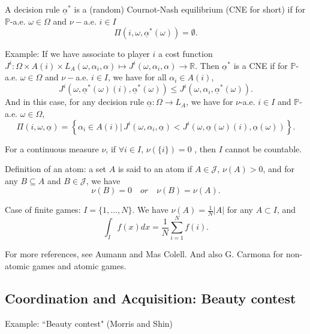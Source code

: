 \begin{definition}
	A decision rule $\underline{\alpha}^*$ is a (random) Cournot-Nash equilibrium (CNE for short) if for $\mathbb{P}$-a.e. $\omega \in \Omega$ and $\nu-$a.e. $i \in I$
	$$
		\Pi(i, \omega, \underline{\alpha}^*(\omega)) = \emptyset.	
	$$
\end{definition}

Example: If we have associate to player $i$ a cost function $J^i : \Omega \times A(i) \times L_A (\omega, \alpha_i, \alpha) \mapsto J^i(\omega, \alpha_i, \alpha) \to \mathbb{R}$. Then $\underline{\alpha}^*$ is a CNE if for $\mathbb{P}$-a.e. $\omega \in \Omega$ and $\nu-$a.e. $i\in I$, we have for all $\alpha_i \in A(i)$,
$$
	J^i(\omega, \underline{\alpha}^*(\omega)(i), \underline{\alpha}^*(\omega) ) \leq J^i( \omega, \alpha_i, \underline{\alpha}^*(\omega)).
$$
And in this case, for any decision rule $\underline{\alpha}: \Omega \to L_A$, we have for $\nu$-a.e. $i\in I$ and $\mathbb{P}$-a.e. $\omega \in \Omega$,
$$
	\Pi(i, \omega, \underline{\alpha}) = \left\{ \alpha_i \in A(i) |  \, J^i(\omega, \alpha_i, \underline{\alpha}) < J^i( \omega, \underline{\alpha}(\omega)(i), \underline{\alpha}(\omega) ) \right\}.
$$


\begin{remark}
	For a continuous measure $\nu$, if $\forall i \in I$, $\nu(\{i\}) =0$ , then $I$ cannot be countable.
	
	Definition of an atom: a set $A$ is said to an atom if $A \in \mathcal{J}$, $\nu(A) >0$, and for any $B \subseteq A$ and $B \in \mathcal{J}$, we have
	$$
		\nu(B) = 0 \quad or \quad \nu(B) = \nu(A).
	$$	
\end{remark}


\begin{remark}
	Case of finite games: $I=\{1,\ldots, N\}$. We have $\nu(A) = \frac{1}{N} | A |$ for any $A \subset I$, and 
	$$
		\int_I f(x) dx = \frac{1}{N} \sum_{i=1}^N f(i).
	$$
\end{remark}

\begin{remark}
For more references, see Aumann and Mas Colell. And also G. Carmona for non-atomic games and atomic games.
\end{remark}



\subsection{Coordination and Acquisition: Beauty contest}
Example: ``Beauty contest" (Morris and Shin)\\

